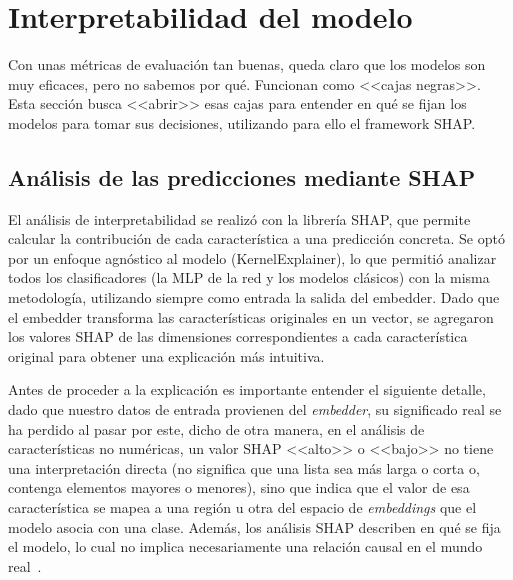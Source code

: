 \section{Interpretabilidad del modelo}

Con unas métricas de evaluación tan buenas, queda claro que los modelos son muy eficaces, pero no sabemos por qué. Funcionan como <<cajas negras>>. Esta sección busca <<abrir>> esas cajas para entender en qué se fijan los modelos para tomar sus decisiones, utilizando para ello el framework SHAP.

\subsection{Análisis de las predicciones mediante SHAP}

El análisis de interpretabilidad se realizó con la librería SHAP, que permite calcular la contribución de cada característica a una predicción concreta. Se optó por un enfoque agnóstico al modelo (KernelExplainer), lo que permitió analizar todos los clasificadores (la MLP de la red y los modelos clásicos) con la misma metodología, utilizando siempre como entrada la salida del embedder. Dado que el embedder transforma las características originales en un vector, se agregaron los valores SHAP de las dimensiones correspondientes a cada característica original para obtener una explicación más intuitiva.

Antes de proceder a la explicación es importante entender el siguiente detalle, dado que nuestro datos de entrada provienen del \textit{embedder}, su significado real se ha perdido al pasar por este, dicho de otra manera, en el análisis de características no numéricas, un valor SHAP <<alto>> o <<bajo>> no tiene una interpretación directa (no significa que una lista sea más larga o corta o, contenga elementos mayores o menores), sino que indica que el valor de esa característica se mapea a una región u otra del espacio de \textit{embeddings} que el modelo asocia con una clase. Además, los análisis SHAP describen en qué se fija el modelo, lo cual no implica necesariamente una relación causal en el mundo real~\cite{shapNotCausal}.


